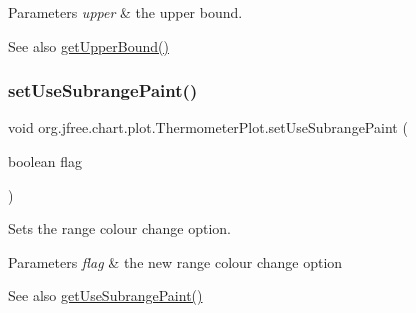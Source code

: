\begin{DoxyParams}{Parameters}
{\em upper} & the upper bound.\\
\hline
\end{DoxyParams}
\begin{DoxySeeAlso}{See also}
\mbox{\hyperlink{classorg_1_1jfree_1_1chart_1_1plot_1_1_thermometer_plot_a075c87a92b66a6895c411e1c674670fe}{get\+Upper\+Bound()}} 
\end{DoxySeeAlso}
\mbox{\label{classorg_1_1jfree_1_1chart_1_1plot_1_1_thermometer_plot_a042ea3581fd39e5ba42636c02b37c50d}} 
\subsubsection{\texorpdfstring{set\+Use\+Subrange\+Paint()}{setUseSubrangePaint()}}
{\footnotesize\ttfamily void org.\+jfree.\+chart.\+plot.\+Thermometer\+Plot.\+set\+Use\+Subrange\+Paint (\begin{DoxyParamCaption}\item[{boolean}]{flag }\end{DoxyParamCaption})}

Sets the range colour change option.


\begin{DoxyParams}{Parameters}
{\em flag} & the new range colour change option\\
\hline
\end{DoxyParams}
\begin{DoxySeeAlso}{See also}
\mbox{\hyperlink{classorg_1_1jfree_1_1chart_1_1plot_1_1_thermometer_plot_a315ab774d4acc16d2256da66c3a427b0}{get\+Use\+Subrange\+Paint()}} 
\end{DoxySeeAlso}
\mbox{\label{classorg_1_1jfree_1_1chart_1_1plot_1_1_thermometer_plot_afefe67cc12c7f466060e5149b699bd8a}} 
